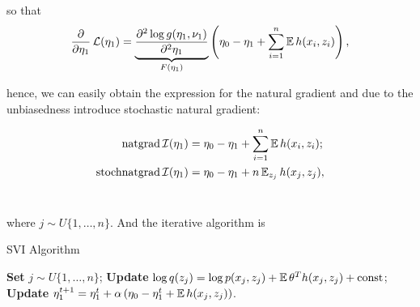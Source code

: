 so that
\begin{equation*}
    \frac{\partial}{\partial \eta_1} \operatorname{\mathcal{L}}(\eta_1) = \underbrace{\frac{\partial^2 \log g(\eta_1, \nu_1)}{\partial^2 \eta_1}}_{F(\eta_1)} \left(\eta_0 - \eta_1 + \sum_{i = 1}^n \operatorname{\mathbb{E}} h(x_i, z_i) \right),
\end{equation*}

hence, we can easily obtain the expression for the natural gradient and due to the unbiasedness introduce stochastic natural gradient:

\begin{equation*}
    \begin{aligned}
        \operatorname{natgrad} \operatorname{\mathcal{I}}(\eta_1) &= \eta_0 - \eta_1 + \sum_{i = 1}^n \operatorname{\mathbb{E}} h(x_i, z_i); \\
        \operatorname{stochnatgrad} \operatorname{\mathcal{I}}(\eta_1) &= \eta_0 - \eta_1 + n \operatorname{\mathbb{E}}_{z_j} h(x_j, z_j),
    \end{aligned}
\end{equation*} \ 

where $j \sim U\{1, \ldots, n\}$. And the iterative algorithm is

\begin{algorithm}
    \caption{SVI Algorithm}
    \begin{algorithmic}
        \State \textbf{Set} $j \sim U\{1, \ldots, n\}$;
        \State \textbf{Update} $\log q(z_j) = \log p(x_j, z_j) + \operatorname{\mathbb{E}} \theta^T h(x_j, z_j) + \operatorname{const}$;
        \State \textbf{Update} $\eta_1^{t+1} = \eta_1^t + \alpha \left( \eta_0 - \eta_1^t + \operatorname{\mathbb{E}} h(x_j, z_j) \right)$.
    \end{algorithmic}
\end{algorithm}




